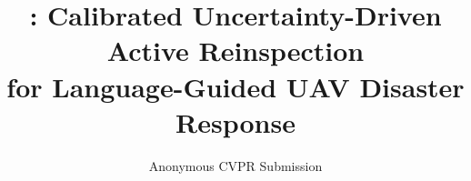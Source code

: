 \documentclass[10pt,twocolumn,letterpaper]{article}
\title{\ProjectName: Calibrated Uncertainty-Driven Active Reinspection\\
for Language-Guided UAV Disaster Response}
\author{Anonymous CVPR Submission}
\begin{document}
\maketitle










{\small


}

\clearpage
\appendix


\end{document}
